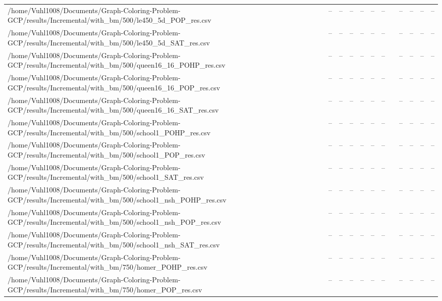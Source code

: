 \begin{table}[htbp]
\begin{tabular}{llllllllllll}
/home/Vuhl1008/Documents/Graph-Coloring-Problem-GCP/results/Incremental/with\_bm/500/le450\_5d\_POP\_res.csv & -- & -- & -- & -- & -- & -- & {} & -- & -- & -- & -- \\
/home/Vuhl1008/Documents/Graph-Coloring-Problem-GCP/results/Incremental/with\_bm/500/le450\_5d\_SAT\_res.csv & -- & -- & -- & -- & -- & -- & {} & -- & -- & -- & -- \\
/home/Vuhl1008/Documents/Graph-Coloring-Problem-GCP/results/Incremental/with\_bm/500/queen16\_16\_POHP\_res.csv & -- & -- & -- & -- & -- & -- & {} & -- & -- & -- & -- \\
/home/Vuhl1008/Documents/Graph-Coloring-Problem-GCP/results/Incremental/with\_bm/500/queen16\_16\_POP\_res.csv & -- & -- & -- & -- & -- & -- & {} & -- & -- & -- & -- \\
/home/Vuhl1008/Documents/Graph-Coloring-Problem-GCP/results/Incremental/with\_bm/500/queen16\_16\_SAT\_res.csv & -- & -- & -- & -- & -- & -- & {} & -- & -- & -- & -- \\
/home/Vuhl1008/Documents/Graph-Coloring-Problem-GCP/results/Incremental/with\_bm/500/school1\_POHP\_res.csv & -- & -- & -- & -- & -- & -- & {} & -- & -- & -- & -- \\
/home/Vuhl1008/Documents/Graph-Coloring-Problem-GCP/results/Incremental/with\_bm/500/school1\_POP\_res.csv & -- & -- & -- & -- & -- & -- & {} & -- & -- & -- & -- \\
/home/Vuhl1008/Documents/Graph-Coloring-Problem-GCP/results/Incremental/with\_bm/500/school1\_SAT\_res.csv & -- & -- & -- & -- & -- & -- & {} & -- & -- & -- & -- \\
/home/Vuhl1008/Documents/Graph-Coloring-Problem-GCP/results/Incremental/with\_bm/500/school1\_nsh\_POHP\_res.csv & -- & -- & -- & -- & -- & -- & {} & -- & -- & -- & -- \\
/home/Vuhl1008/Documents/Graph-Coloring-Problem-GCP/results/Incremental/with\_bm/500/school1\_nsh\_POP\_res.csv & -- & -- & -- & -- & -- & -- & {} & -- & -- & -- & -- \\
/home/Vuhl1008/Documents/Graph-Coloring-Problem-GCP/results/Incremental/with\_bm/500/school1\_nsh\_SAT\_res.csv & -- & -- & -- & -- & -- & -- & {} & -- & -- & -- & -- \\
/home/Vuhl1008/Documents/Graph-Coloring-Problem-GCP/results/Incremental/with\_bm/750/homer\_POHP\_res.csv & -- & -- & -- & -- & -- & -- & {} & -- & -- & -- & -- \\
/home/Vuhl1008/Documents/Graph-Coloring-Problem-GCP/results/Incremental/with\_bm/750/homer\_POP\_res.csv & -- & -- & -- & -- & -- & -- & {} & -- & -- & -- & -- \\

\end{tabular}
\end{table}
